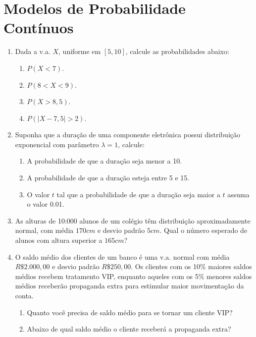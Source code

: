 \thispagestyle{cap4}
\section*{Modelos de Probabilidade Contínuos}
\begin{enumerate}
\item Dada a v.a. $X$, uniforme em $[5, 10]$, calcule as probabilidades abaixo:
	\begin{enumerate}[label=\alph*)]
		\item $P(X < 7)$.
		\item $P(8 < X < 9)$.
		\item $P(X > 8,5)$.
		\item $P(|X-7,5| > 2)$.
	\end{enumerate}

\setcounter{enumi}{2}
\item Suponha que a duração de uma componente eletrônica possui distribuição exponencial com parâmetro $\lambda = 1$, calcule:
	\begin{enumerate}[label=\alph*)]
		\item A probabilidade de que a duração seja menor a 10.
		\item A probabilidade de que a duração esteja entre 5 e 15.
		\item O valor $t$ tal que a probabilidade de que a duração seja maior a $t$ assuma o valor 0.01.
	\end{enumerate}

\item As alturas de 10:000 alunos de um colégio têm distribuição aproximadamente normal, com média $170cm$ e desvio padrão $5cm$. Qual o número esperado de alunos com altura superior a $165cm$?

\setcounter{enumi}{10}
\item O saldo médio dos clientes de um banco é uma v.a. normal com média $R\$ 2.000,00$ e desvio padrão $R\$ 250,00$. Os clientes com os 10\% maiores saldos médios recebem tratamento VIP, enquanto aqueles com os 5\% menores saldos médios receberão propaganda extra para estimular maior movimentação da conta.
	\begin{enumerate}[label=\alph*)]
		\item Quanto você precisa de saldo médio para se tornar um cliente VIP?
		\item Abaixo de qual saldo médio o cliente receberá a propaganda extra?
	\end{enumerate}
\end{enumerate}